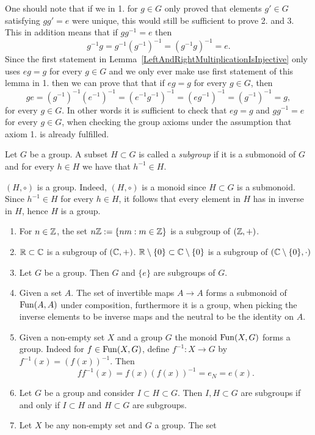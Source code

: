 \begin{remark}
    One should note that if we in 1. for $g\in G$ only proved that elements $g'\in G$ satisfying $gg' = e$ were unique, this would still be sufficient to prove 2. and 3. This in addition means that if $gg^{-1} =e$ then 
    $$g^{-1}g = g^{-1}\left(g^{-1}\right)^{-1} = (g^{-1}g)^{-1} = e.$$
    Since the first statement in Lemma~\ref{LeftAndRightMultiplicationIsInjective} only uses $eg = g$ for every $g\in G$ and we only ever make use first statement of this lemma in 1. then we can prove that that if $eg = g$ for every $g\in G$, then
    $$ge = \left(g^{-1}\right)^{-1} \left(e^{-1}\right)^{-1} =\left(e^{-1}g^{-1}\right)^{-1} = \left(e g^{-1}\right)^{-1} = \left( g^{-1}\right)^{-1} =g,$$
    for every $g\in G$.
    In other words it is sufficient to check that $eg = g$ and $gg^{-1} = e$ for every $g\in G$, when checking the group axioms under the assumption that axiom 1. is already fulfilled.
\end{remark}
\begin{definition}
    Let $G$ be a group. A subset $H\subset G$ is called a \textit{subgroup} if it is a submonoid of $G$ and for every $h \in H$ we have that $h^{-1} \in H$.
\end{definition}
\begin{remark}\label{ASubgroupIsAGroup}
    $(H,\circ)$ is a group. Indeed, $(H,\circ)$ is a monoid since $H\subset G$ is a submonoid. Since $h^{-1}\in H$ for every $h\in H$, it follows that every element in $H$ has in inverse in $H$, hence $H$ is a group.
\end{remark}
\begin{example}
    \begin{enumerate}
        \item For $n\in \mathbb{Z}$, the set $n\mathbb{Z} := \{nm : m\in \mathbb{Z}\}$ is a subgroup of $(\mathbb{Z},+)$.
        \item $\mathbb{R}\subset \mathbb{C}$ is a subgroup of $(\mathbb{C},+)$. $\mathbb{R}\setminus \{0\} \subset \mathbb{C}\setminus \{0\}$ is a subgroup of $(\mathbb{C}\setminus \{0\},\cdot)$
        \item Let $G$ be a group. Then $G$ and $\{e\}$ are subgroups of $G$.
        \item Given a set $A$. The set of invertible maps $A\rightarrow A$ forms a submonoid of $\mathrm{Fun}(A,A)$ under composition, furthermore it is a group, when picking the inverse elements to be inverse maps and the neutral to be the identity on $A$. 
        \item Given a non-empty set $X$ and a group $G$ the monoid $\mathrm{Fun}(X,G)$ forms a group. Indeed for $f\in \mathrm{Fun}(X,G)$, define $f^{-1}:X\rightarrow G$ by $f^{-1}(x) = \left(f(x)\right)^{-1}$. Then 
        $$ff^{-1}(x) = f(x)\left(f(x)\right)^{-1}= e_N = e(x).$$
        \item Let $G$ be a group and consider $I\subset H \subset G$. Then $I,H\subset G $ are subgroups if and only if $I\subset H$ and $H\subset G$ are subgroups.
        \item Let $X$ be any non-empty set and $G$ a group. The set 
    \end{enumerate}
\end{example}
